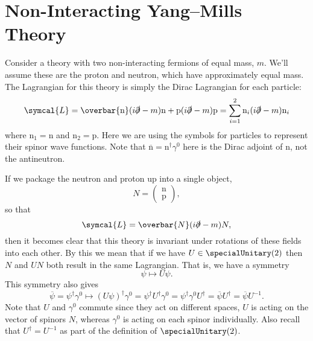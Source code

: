 \documentclass[fleqn]{NotesClass}
\newcommand{\Pparticle}[1]{\mathrm{#1}}
\newcommand{\Pp}{\ensuremath{\Pparticle{p}}}
\newcommand{\Pn}{\ensuremath{\Pparticle{n}}}
\newcommand{\diracadjoint}[1]{\overbar{#1}}
\newcommand{\hermit}{\dagger}
\newcommand{\lagrangianDensity}{\symcal{L}}
\begin{document}
    \section{Non-Interacting Yang--Mills Theory}
    Consider a theory with two non-interacting fermions of equal mass, \(m\).
    We'll assume these are the proton and neutron, which have approximately equal mass.
    The Lagrangian for this theory is simply the Dirac Lagrangian for each particle:
    \begin{equation}
        \lagrangianDensity = \diracadjoint{\Pn}(i\slashed{\partial} - m)\Pn + \Pp(i\slashed{\partial} - m)\Pp = \sum_{i=1}^{2} \Pn_i(i\slashed{\partial} - m)\Pn_i
    \end{equation}
    where \(\Pn_1 = \Pn\) and \(\Pn_2 = \Pp\).
    Here we are using the symbols for particles to represent their spinor wave functions.
    Note that \(\diracadjoint{\Pn} = \Pn^\hermit \gamma^0\) here is the Dirac adjoint of \(\Pn\), not the antineutron.
    
    If we package the neutron and proton up into a single object,
    \begin{equation}
        N = 
        \begin{pmatrix}
            \Pn\\ \Pp
        \end{pmatrix}
        ,
    \end{equation}
    so that
    \begin{equation}
        \lagrangianDensity = \diracadjoint{N}(i\slashed{\partial} - m)N,
    \end{equation}
    then it becomes clear that this theory is invariant under rotations of these fields into each other.
    By this we mean that if we have \(U \in \specialUnitary(2)\) then \(N\) and \(UN\) both result in the same Lagrangian.
    That is, we have a symmetry
    \begin{equation}
        \psi \mapsto U\psi.
    \end{equation}
    This symmetry also gives
    \begin{equation}
        \diracadjoint{\psi} = \psi^\hermit \gamma^0 \mapsto (U\psi)^\hermit \gamma^0 = \psi^\hermit U^\hermit \gamma^0 = \psi^\hermit \gamma^0 U^\hermit = \diracadjoint{\psi}U^\hermit = \diracadjoint{\psi}U^{-1}.
    \end{equation}
    Note that \(U\) and \(\gamma^0\) commute since they act on different spaces, \(U\) is acting on the vector of spinors \(N\), whereas \(\gamma^0\) is acting on each spinor individually.
    Also recall that \(U^\hermit = U^{-1}\) as part of the definition of \(\specialUnitary(2)\).
    
\end{document}
